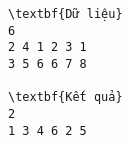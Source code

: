 \begin{verbatim}
\textbf{Dữ liệu}
6
2 4 1 2 3 1
3 5 6 6 7 8

\textbf{Kết quả}
2
1 3 4 6 2 5
\end{verbatim}